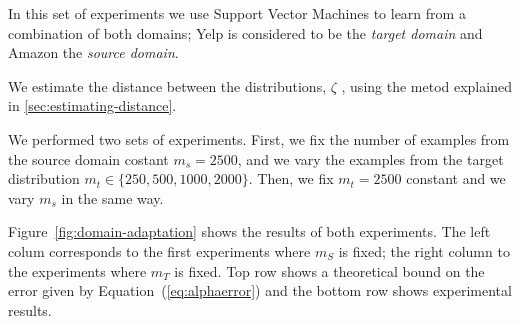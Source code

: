 \documentclass[letterpaper]{article}
\begin{document}
In this set of experiments we use Support Vector Machines to learn
from a combination of both domains; Yelp is considered to be the
\emph{target domain} and Amazon the \emph{source domain}.

We estimate the distance between the distributions, $\zeta$ , using
the metod explained in \ref{sec:estimating-distance}. 

We performed two sets of experiments. First, we fix the number of
examples from the source domain costant $m_s=2500$, and we vary the
examples from the target distribution $m_t \in \{250, 500, 1000,
2000\}$. Then, we fix $m_t=2500$ constant and we vary $m_s$ in the
same way. 

Figure~\ref{fig:domain-adaptation} shows the results of both
experiments. The left colum corresponds to the first experiments where
$m_S$ is fixed; the right column to the experiments where $m_T$ is
fixed. Top row shows a theoretical bound on the error given by
Equation~(\ref{eq:alphaerror}) and the bottom row shows experimental
results.
\end{document}
